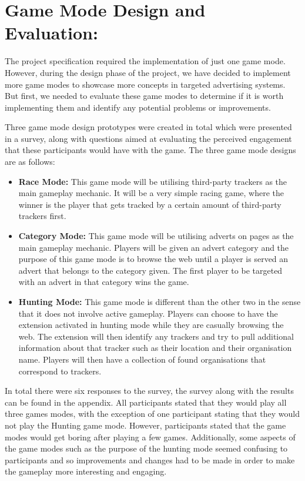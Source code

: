 \documentclass{l4proj}
\begin{document}
\section{Game Mode Design and Evaluation:}
The project specification required the implementation of just one game mode. However, during the design phase of the project, we have decided to implement more game modes to showcase more concepts in targeted advertising systems. But first, we needed to evaluate these game modes to determine if it is worth implementing them and identify any potential problems or improvements.

Three game mode design prototypes were created in total which were presented in a survey, along with questions aimed at evaluating the perceived engagement that these participants would have with the game. The three game mode designs are as follows:

\begin{itemize}
   \item
   \textbf{Race Mode:} This game mode will be utilising third-party trackers as the main gameplay mechanic. It will be a very simple racing game, where the winner is the player that gets tracked by a certain amount of third-party trackers first.

   \item
   \textbf{Category Mode:} This game mode will be utilising adverts on pages as the main gameplay mechanic. Players will be given an advert category and the purpose of this game mode is to browse the web until a player is served an advert that belongs to the category given. The first player to be targeted with an advert in that category wins the game.

   \item
   \textbf{Hunting Mode:} This game mode is different than the other two in the sense that it does not involve active gameplay. Players can choose to have the extension activated in hunting mode while they are casually browsing the web. The extension will then identify any trackers and try to pull additional information about that tracker such as their location and their organisation name. Players will then have a collection of found organisations that correspond to trackers.
\end{itemize}

In total there were six responses to the survey, the survey along with the results can be found in the appendix. All participants stated that they would play all three games modes, with the exception of one participant stating that they would not play the Hunting game mode. However, participants stated that the game modes would get boring after playing a few games. Additionally, some aspects of the game modes such as the purpose of the hunting mode seemed confusing to participants and so improvements and changes had to be made in order to make the gameplay more interesting and engaging.
\end{document}
